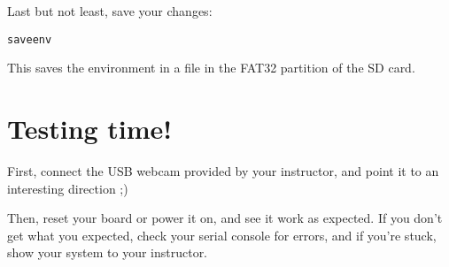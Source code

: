 Last but not least, save your changes:
\begin{verbatim}
saveenv
\end{verbatim}

This saves the environment in a  file in the FAT32
partition of the SD card.

\section{Testing time!}

First, connect the USB webcam provided by your instructor, and point it
to an interesting direction ;)

Then, reset your board or power it on, and see it work as expected. If
you don't get what you expected, check your serial console for errors,
and if you're stuck, show your system to your instructor.
